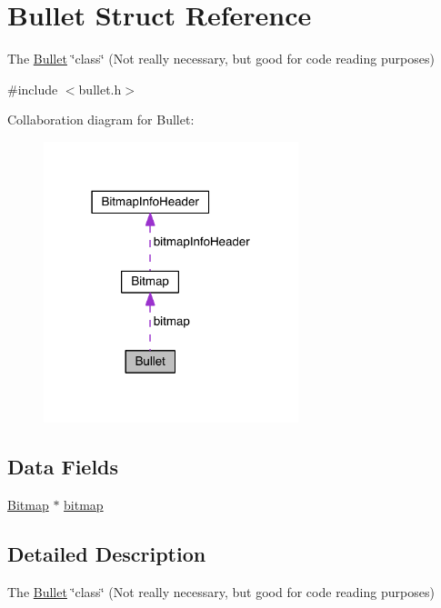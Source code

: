 \hypertarget{struct_bullet}{}\section{Bullet Struct Reference}
\label{struct_bullet}


The \hyperlink{struct_bullet}{Bullet} \char`\"{}class\char`\"{} (Not really necessary, but good for code reading purposes)  




{\ttfamily \#include $<$bullet.\+h$>$}



Collaboration diagram for Bullet\+:
\nopagebreak
\begin{figure}[H]
\begin{center}
\leavevmode
\includegraphics[width=210pt]{struct_bullet__coll__graph}
\end{center}
\end{figure}
\subsection*{Data Fields}
\begin{DoxyCompactItemize}
\item 
\hyperlink{struct_bitmap}{Bitmap} $\ast$ \hyperlink{struct_bullet_a00c870e2cedff0b231b1c8ad85019f66}{bitmap}
\end{DoxyCompactItemize}


\subsection{Detailed Description}
The \hyperlink{struct_bullet}{Bullet} \char`\"{}class\char`\"{} (Not really necessary, but good for code reading purposes) 

